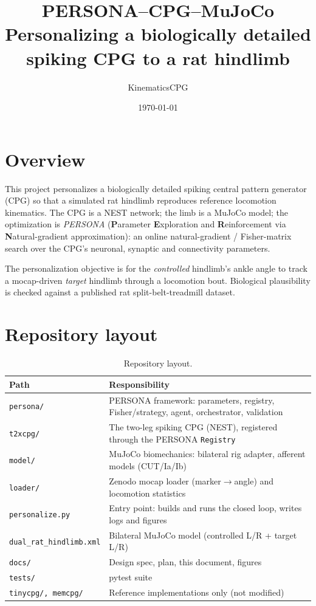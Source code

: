 \documentclass[11pt]{article}
\title{\textbf{PERSONA--CPG--MuJoCo}\\[2pt]
\large Personalizing a biologically detailed spiking CPG to a rat hindlimb}
\author{KinematicsCPG}
\date{\today}
\begin{document}
\maketitle

\tableofcontents

\section{Overview}
\label{sec:overview}

This project personalizes a biologically detailed spiking central pattern
generator (CPG) so that a simulated rat hindlimb reproduces reference
locomotion kinematics. The CPG is a NEST network; the limb is a MuJoCo model;
the optimization is \emph{PERSONA}
(\textbf{P}arameter \textbf{E}xploration and \textbf{R}einforcement via
\textbf{N}atural-gradient approximation): an online natural-gradient /
Fisher-matrix search over the CPG's neuronal, synaptic and connectivity
parameters.

The personalization objective is for the \emph{controlled} hindlimb's ankle
angle to track a mocap-driven \emph{target} hindlimb through a locomotion
bout. Biological plausibility is checked against a published rat
split-belt-treadmill dataset.

\section{Repository layout}
\label{sec:layout}

\begin{table}[h]
\centering
\begin{tabular}{ll}
\toprule
Path & Responsibility \\
\midrule
\texttt{persona/} & PERSONA framework: parameters, registry, Fisher/strategy, agent, orchestrator, validation \\
\texttt{t2xcpg/} & The two-leg spiking CPG (NEST), registered through the PERSONA \texttt{Registry} \\
\texttt{model/} & MuJoCo biomechanics: bilateral rig adapter, afferent models (CUT/Ia/Ib) \\
\texttt{loader/} & Zenodo mocap loader (marker$\rightarrow$angle) and locomotion statistics \\
\texttt{personalize.py} & Entry point: builds and runs the closed loop, writes logs and figures \\
\texttt{dual\_rat\_hindlimb.xml} & Bilateral MuJoCo model (controlled L/R + target L/R) \\
\texttt{docs/} & Design spec, plan, this document, figures \\
\texttt{tests/} & pytest suite \\
\texttt{tinycpg/, memcpg/} & Reference implementations only (not modified) \\
\bottomrule
\end{tabular}
\caption{Repository layout.}
\end{table}
\end{document}
